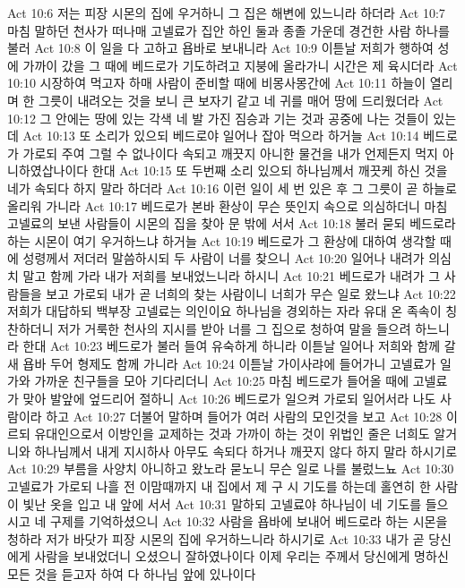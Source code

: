 Act 10:6  저는 피장 시몬의 집에 우거하니 그 집은 해변에 있느니라 하더라
Act 10:7  마침 말하던 천사가 떠나매 고넬료가 집안 하인 둘과 종졸 가운데 경건한 사람 하나를 불러
Act 10:8  이 일을 다 고하고 욥바로 보내니라
Act 10:9  이튿날 저희가 행하여 성에 가까이 갔을 그 때에 베드로가 기도하려고 지붕에 올라가니 시간은 제 육시더라
Act 10:10  시장하여 먹고자 하매 사람이 준비할 때에 비몽사몽간에
Act 10:11  하늘이 열리며 한 그릇이 내려오는 것을 보니 큰 보자기 같고 네 귀를 매어 땅에 드리웠더라
Act 10:12  그 안에는 땅에 있는 각색 네 발 가진 짐승과 기는 것과 공중에 나는 것들이 있는데
Act 10:13  또 소리가 있으되 베드로야 일어나 잡아 먹으라 하거늘
Act 10:14  베드로가 가로되 주여 그럴 수 없나이다 속되고 깨끗지 아니한 물건을 내가 언제든지 먹지 아니하였삽나이다 한대
Act 10:15  또 두번째 소리 있으되 하나님께서 깨끗케 하신 것을 네가 속되다 하지 말라 하더라
Act 10:16  이런 일이 세 번 있은 후 그 그릇이 곧 하늘로 올리워 가니라
Act 10:17  베드로가 본바 환상이 무슨 뜻인지 속으로 의심하더니 마침 고넬료의 보낸 사람들이 시몬의 집을 찾아 문 밖에 서서
Act 10:18  불러 묻되 베드로라 하는 시몬이 여기 우거하느냐 하거늘
Act 10:19  베드로가 그 환상에 대하여 생각할 때에 성령께서 저더러 말씀하시되 두 사람이 너를 찾으니
Act 10:20  일어나 내려가 의심치 말고 함께 가라 내가 저희를 보내었느니라 하시니
Act 10:21  베드로가 내려가 그 사람들을 보고 가로되 내가 곧 너희의 찾는 사람이니 너희가 무슨 일로 왔느냐
Act 10:22  저희가 대답하되 백부장 고넬료는 의인이요 하나님을 경외하는 자라 유대 온 족속이 칭찬하더니 저가 거룩한 천사의 지시를 받아 너를 그 집으로 청하여 말을 들으려 하느니라 한대
Act 10:23  베드로가 불러 들여 유숙하게 하니라 이튿날 일어나 저희와 함께 갈새 욥바 두어 형제도 함께 가니라
Act 10:24  이튿날 가이사랴에 들어가니 고넬료가 일가와 가까운 친구들을 모아 기다리더니
Act 10:25  마침 베드로가 들어올 때에 고넬료가 맞아 발앞에 엎드리어 절하니
Act 10:26  베드로가 일으켜 가로되 일어서라 나도 사람이라 하고
Act 10:27  더불어 말하며 들어가 여러 사람의 모인것을 보고
Act 10:28  이르되 유대인으로서 이방인을 교제하는 것과 가까이 하는 것이 위법인 줄은 너희도 알거니와 하나님께서 내게 지시하사 아무도 속되다 하거나 깨끗지 않다 하지 말라 하시기로
Act 10:29  부름을 사양치 아니하고 왔노라 묻노니 무슨 일로 나를 불렀느뇨
Act 10:30  고넬료가 가로되 나흘 전 이맘때까지 내 집에서 제 구 시 기도를 하는데 홀연히 한 사람이 빛난 옷을 입고 내 앞에 서서
Act 10:31  말하되 고넬료야 하나님이 네 기도를 들으시고 네 구제를 기억하셨으니
Act 10:32  사람을 욥바에 보내어 베드로라 하는 시몬을 청하라 저가 바닷가 피장 시몬의 집에 우거하느니라 하시기로
Act 10:33  내가 곧 당신에게 사람을 보내었더니 오셨으니 잘하였나이다 이제 우리는 주께서 당신에게 명하신 모든 것을 듣고자 하여 다 하나님 앞에 있나이다

